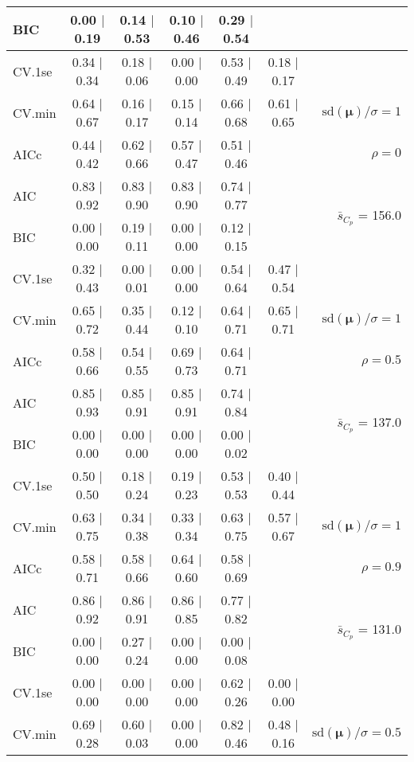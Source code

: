 \documentclass[12pt]{article}
\newcommand{\mr}[1]{\mathrm{#1}}
\newcommand{\bm}[1]{\mathbf{#1}}
\begin{document}
\begin{table}[p]
\begin{center}
\begin{tabular}{l*{5}{c}|r}
BIC & 0.00 $\mid$ 0.19 & 0.14 $\mid$ 0.53 & 0.10 $\mid$ 0.46 & 0.29 $\mid$ 0.54 & & \\
 \hline 
CV.1se & 0.34 $\mid$ 0.34 & 0.18 $\mid$ 0.06 & 0.00 $\mid$ 0.00 & 0.53 $\mid$ 0.49 & 0.18 $\mid$ 0.17 &\\
CV.min & 0.64 $\mid$ 0.67 & 0.16 $\mid$ 0.17 & 0.15 $\mid$ 0.14 & 0.66 $\mid$ 0.68 & 0.61 $\mid$ 0.65 &  $\mr{sd}(\bm{\mu})/\sigma=1$ \\
AICc & 0.44 $\mid$ 0.42 & 0.62 $\mid$ 0.66 & 0.57 $\mid$ 0.47 & 0.51 $\mid$ 0.46 & & $\rho=0$ \\
AIC & 0.83 $\mid$ 0.92 & 0.83 $\mid$ 0.90 & 0.83 $\mid$ 0.90 & 0.74 $\mid$ 0.77 & & \multirow{2}{*}{$\bar{s}_{C_p}$ = 156.0} \\
BIC & 0.00 $\mid$ 0.00 & 0.19 $\mid$ 0.11 & 0.00 $\mid$ 0.00 & 0.12 $\mid$ 0.15 & & \\
 \hline 
CV.1se & 0.32 $\mid$ 0.43 & 0.00 $\mid$ 0.01 & 0.00 $\mid$ 0.00 & 0.54 $\mid$ 0.64 & 0.47 $\mid$ 0.54 &\\
CV.min & 0.65 $\mid$ 0.72 & 0.35 $\mid$ 0.44 & 0.12 $\mid$ 0.10 & 0.64 $\mid$ 0.71 & 0.65 $\mid$ 0.71 &  $\mr{sd}(\bm{\mu})/\sigma=1$ \\
AICc & 0.58 $\mid$ 0.66 & 0.54 $\mid$ 0.55 & 0.69 $\mid$ 0.73 & 0.64 $\mid$ 0.71 & & $\rho=0.5$ \\
AIC & 0.85 $\mid$ 0.93 & 0.85 $\mid$ 0.91 & 0.85 $\mid$ 0.91 & 0.74 $\mid$ 0.84 & & \multirow{2}{*}{$\bar{s}_{C_p}$ = 137.0} \\
BIC & 0.00 $\mid$ 0.00 & 0.00 $\mid$ 0.00 & 0.00 $\mid$ 0.00 & 0.00 $\mid$ 0.02 & & \\
 \hline 
CV.1se & 0.50 $\mid$ 0.50 & 0.18 $\mid$ 0.24 & 0.19 $\mid$ 0.23 & 0.53 $\mid$ 0.53 & 0.40 $\mid$ 0.44 &\\
CV.min & 0.63 $\mid$ 0.75 & 0.34 $\mid$ 0.38 & 0.33 $\mid$ 0.34 & 0.63 $\mid$ 0.75 & 0.57 $\mid$ 0.67 &  $\mr{sd}(\bm{\mu})/\sigma=1$ \\
AICc & 0.58 $\mid$ 0.71 & 0.58 $\mid$ 0.66 & 0.64 $\mid$ 0.60 & 0.58 $\mid$ 0.69 & & $\rho=0.9$ \\
AIC & 0.86 $\mid$ 0.92 & 0.86 $\mid$ 0.91 & 0.86 $\mid$ 0.85 & 0.77 $\mid$ 0.82 & & \multirow{2}{*}{$\bar{s}_{C_p}$ = 131.0} \\
BIC & 0.00 $\mid$ 0.00 & 0.27 $\mid$ 0.24 & 0.00 $\mid$ 0.00 & 0.00 $\mid$ 0.08 & & \\
 \hline 
CV.1se & 0.00 $\mid$ 0.00 & 0.00 $\mid$ 0.00 & 0.00 $\mid$ 0.00 & 0.62 $\mid$ 0.26 & 0.00 $\mid$ 0.00 &\\
CV.min & 0.69 $\mid$ 0.28 & 0.60 $\mid$ 0.03 & 0.00 $\mid$ 0.00 & 0.82 $\mid$ 0.46 & 0.48 $\mid$ 0.16 &  $\mr{sd}(\bm{\mu})/\sigma=0.5$ \\

\end{tabular}
\end{center}
\end{table}
\end{document}
